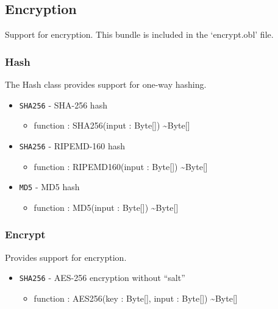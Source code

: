 \documentclass[11pt]{article}
\begin{document}
\subsection{Encryption}
Support for encryption.  This bundle is included in the `encrypt.obl' file.

\subsubsection{Hash}
The Hash class provides support for one-way hashing.

\begin{itemize}
\item \texttt{SHA256} - SHA-256 hash
  \begin{itemize}
  \item function : SHA256(input : Byte[]) \textasciitilde Byte[]
  \end{itemize}
\end{itemize}

\begin{itemize}
\item \texttt{SHA256} - RIPEMD-160 hash
  \begin{itemize}
  \item function : RIPEMD160(input : Byte[]) \textasciitilde Byte[]
  \end{itemize}
\end{itemize}

\begin{itemize}
\item \texttt{MD5} - MD5 hash
  \begin{itemize}
  \item function : MD5(input : Byte[]) \textasciitilde Byte[]
  \end{itemize}
\end{itemize}

\subsubsection{Encrypt}
Provides support for encryption.

\begin{itemize}
\item \texttt{SHA256} - AES-256 encryption without ``salt''
  \begin{itemize}
  \item function : AES256(key : Byte[], input : Byte[])
    \textasciitilde Byte[]
  \end{itemize}
\end{itemize}
\end{document}

